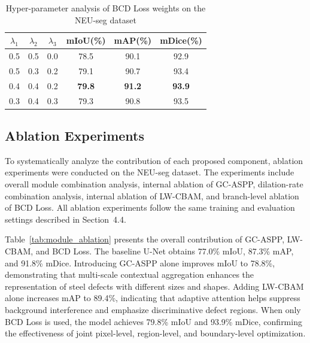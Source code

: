 \documentclass[sn-basic]{sn-jnl}
\theoremstyle{thmstyleone}%
\theoremstyle{thmstyletwo}%
\theoremstyle{thmstylethree}%
\begin{document}
\begin{table}[htbp]
\caption{Hyper-parameter analysis of BCD Loss weights on the NEU-seg dataset}
\label{tab:bcd_weight}
\centering
\begin{tabular}{cccccc}
\toprule
$\lambda_1$ & $\lambda_2$ & $\lambda_3$ & mIoU(\%) & mAP(\%) & mDice(\%) \\
\midrule
0.5 & 0.5 & 0.0 & 78.5 & 90.1 & 92.9 \\
0.5 & 0.3 & 0.2 & 79.1 & 90.7 & 93.4 \\
0.4 & 0.4 & 0.2 & \textbf{79.8} & \textbf{91.2} & \textbf{93.9} \\
0.3 & 0.4 & 0.3 & 79.3 & 90.8 & 93.5 \\
\bottomrule
\end{tabular}
\end{table}

\subsection{Ablation Experiments}
To systematically analyze the contribution of each proposed component, ablation experiments were conducted on the NEU-seg dataset. The experiments include overall module combination analysis, internal ablation of GC-ASPP, dilation-rate combination analysis, internal ablation of LW-CBAM, and branch-level ablation of BCD Loss. All ablation experiments follow the same training and evaluation settings described in Section~4.4.

Table~\ref{tab:module_ablation} presents the overall contribution of GC-ASPP, LW-CBAM, and BCD Loss. The baseline U-Net obtains 77.0\% mIoU, 87.3\% mAP, and 91.8\% mDice. Introducing GC-ASPP alone improves mIoU to 78.8\%, demonstrating that multi-scale contextual aggregation enhances the representation of steel defects with different sizes and shapes. Adding LW-CBAM alone increases mAP to 89.4\%, indicating that adaptive attention helps suppress background interference and emphasize discriminative defect regions. When only BCD Loss is used, the model achieves 79.8\% mIoU and 93.9\% mDice, confirming the effectiveness of joint pixel-level, region-level, and boundary-level optimization.
\end{document}
